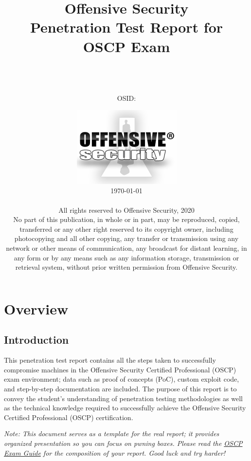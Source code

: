 \documentclass[a4paper, 10pt, oneside]{article}
\title{{\textbf{\Huge Offensive Security}}\\Penetration Test Report for\\OSCP Exam}
\author{\vspace{.8cm}\\{\LARGE \name}\\[1em]\email\\[1em]OSID: \osid}
\date{\vspace{1cm}\includegraphics{offsec_logo.png}\\\vspace{2cm} \today\\ \vspace{.25cm} \textcopyright\\\vspace{.25cm}
{\small All rights reserved to Offensive Security, 2020\\
No part of this publication, in whole or in part, may be reproduced, copied, transferred or any other right reserved to its copyright owner, including photocopying and all other copying, any transfer or transmission using any network or other means of communication, any broadcast for distant learning, in any form or by any means such as any information storage, transmission or retrieval system, without prior written permission from Offensive Security.}
}
\begin{document}
\maketitle
\thispagestyle{empty}
\tableofcontents
\thispagestyle{empty}
\pagebreak 

\newcommand{\hostname}{}
\newcommand{\ip}{}
\newcommand{\tcpports}{} 
\newcommand{\udpports}{} 
\newcommand{\os}{}
\newcommand{\vuln}{}
\newcommand{\product}{}
\newcommand{\vulnx}{}
\newcommand{\productx}{}
\newcommand{\client}{\textit{kali (ZZ.ZZ.ZZ.ZZ)}}

\section{Overview}
\subsection{Introduction}
This penetration test report contains all the steps %
taken to successfully compromise machines in the Offensive Security Certified Professional (OSCP) exam environment; data such as proof of concepts (PoC), custom exploit code, and step-by-step documentation are included. The purpose of this report is to convey the student's %
understanding of penetration testing methodologies as well as the technical knowledge required %
to successfully achieve the Offensive Security Certified Professional (OSCP) certification.

\textit{Note: This document serves as a template for the real report; it provides organized presentation so you can focus on pwning boxes. Please read the \href{https://support.offensive-security.com/oscp-exam-guide/}{OSCP Exam Guide} for the composition of your report. Good luck and try harder!}
\end{document}
